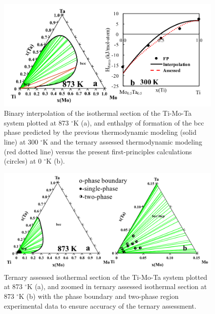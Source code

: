 \newpage
\begin{figure}[H]
	\centering
	\includegraphics[width=\textwidth]{Chapter-3/Figures/TiMoTa1.png}
	\caption{Binary interpolation of the isothermal section of the Ti-Mo-Ta system plotted at 873 $^{\circ}$K (a), and enthalpy of formation of the bcc phase predicted by the previous thermodynamic modeling (solid line) at 300 $^{\circ}$K and the ternary assessed thermodynamic modeling (red dotted line) versus the present first-principles calculations (circles) at 0 $^{\circ}$K (b).}
	\label{Ch3-figure:TiMoTa1}
\end{figure}

\newpage
\begin{figure}[H]
	\centering
	\includegraphics[width=\textwidth]{Chapter-3/Figures/TiMoTa2.png}
	\caption{Ternary assessed isothermal section of the Ti-Mo-Ta system plotted at 873 $^{\circ}$K (a), and zoomed in ternary assessed isothermal section at 873 $^{\circ}$K (b) with the phase boundary and two-phase region experimental data \cite{Nikitin1971} to ensure accuracy of the ternary assessment.}
	\label{Ch3-figure:TiMoTa2}
\end{figure}


